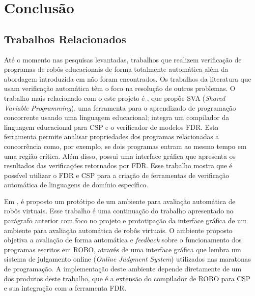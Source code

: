 \chapter{Conclusão}
\label{chap:cap5}

\section{Trabalhos Relacionados}

Até o momento nas pesquisas levantadas, trabalhos que realizem verificação de programas de robôs educacionais de forma totalmente automática além da abordagem introduzida em \cite{nogueira} não foram encontrados. Os trabalhos da literatura que usam verificação automática têm o foco na resolução de outros problemas. O trabalho mais relacionado com o este projeto é \cite{SVA}, que propõe SVA (\textit{Shared Variable Programming}), uma ferramenta para o aprendizado de programação concorrente usando uma linguagem educacional; integra um compilador da linguagem educacional para CSP e o verificador de modelos FDR. Esta ferramenta permite analisar propriedades dos programas relacionadas a concorrência como, por exemplo, se dois programas entram ao mesmo tempo em uma região crítica. Além disso, possui uma interface gráfica que apresenta os resultados das verificações retornados por FDR. Esse trabalho mostra que é possível utilizar o FDR e CSP para a criação de ferramentas de verificação automática de linguagens de domínio específico. 

Em \cite{emanuel2017}, é proposto um protótipo de um ambiente para avaliação automática de robôs virtuais. Esse trabalho é uma continuação do trabalho apresentado no parágrafo anterior com foco no projeto e prototipação da interface gráfica de um ambiente para avaliação automática de robôs virtuais. O ambiente proposto objetiva a avaliação de forma automática e \textit{feedback} sobre o funcionamento dos programas escritos em ROBO, através de uma interface gráfica que lembra um sistema de julgamento online (\textit{Online Judgment System}) utilizados nas maratonas de programação. A implementação deste ambiente depende diretamente de um dos produtos deste trabalho, que é a extensão do compilador de ROBO para CSP e sua integração com a ferramenta FDR.

